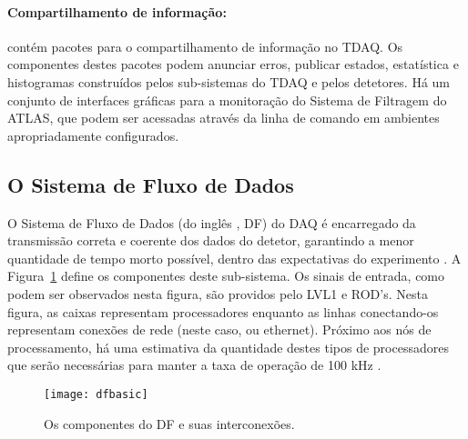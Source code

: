 \paragraph{Compartilhamento de informação:} contém pacotes para o
compartilhamento de informação no TDAQ. Os componentes destes pacotes podem
anunciar erros, publicar estados, estatística e histogramas construídos pelos
sub-sistemas do TDAQ e pelos detetores. Há um conjunto de interfaces gráficas
para a monitoração do Sistema de Filtragem do ATLAS, que podem ser acessadas
através da linha de comando em ambientes apropriadamente configurados.



\subsection{O Sistema de Fluxo de Dados}
\label{sec:dataflow}

O Sistema de Fluxo de Dados (do inglês , DF) do DAQ é
encarregado da transmissão correta e coerente dos dados do detetor, garantindo
a menor quantidade de tempo morto possível, dentro das expectativas do
experimento \cite{aa:chep-2003-2, aa:rt-2003, aa:tns-2004-3}. A
Figura~\ref{fig:dfbasic} define os componentes deste sub-sistema. Os sinais de
entrada, como podem ser observados nesta figura, são providos pelo LVL1 e
ROD's. Nesta figura, as caixas representam processadores enquanto as linhas
conectando-os representam conexões de rede (neste caso,  ou
 ethernet). Próximo aos nós de processamento, há uma
estimativa da quantidade destes tipos de processadores que serão necessárias
para manter a taxa de operação de 100 kHz \cite{hlt-tdr}.

\begin{figure}
\begin{center}
\texttt{[image: dfbasic]}
\end{center}
\caption{Os componentes do DF e suas interconexões.}
\label{fig:dfbasic}
\end{figure}

